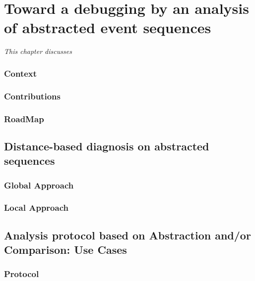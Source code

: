 \chapter{Toward a debugging by an analysis of abstracted event sequences}
\label{c5_sec:intro}
\textit{This chapter discusses}
\vspace{2ex}\vfill
\minitoc

\subsection*{Context}

\subsection*{Contributions}
\subsection*{RoadMap}


\section{Distance-based diagnosis on abstracted sequences}
\label{c5:sec-absdiag}



  \subsection{Global Approach}
  \subsection{Local Approach}



\section{Analysis protocol based on Abstraction and/or Comparison: Use Cases}
\label{c5:sec-debug}


\subsection{Protocol}
